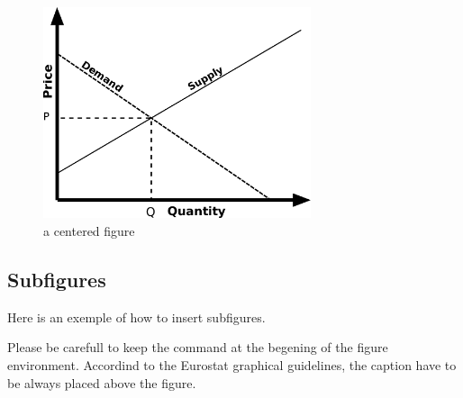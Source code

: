 \documentclass[Theme1]{{template_material/eurostat}}
\begin{document}
\begin{figure}[h]
    \caption{a centered figure} %
    \label{fig:figure2}
    \centering
    \includegraphics[width=0.7\textwidth]{template_material/FiguresFiles/Simple_supply_and_demand.svg.png}
\end{figure}

\newpage
\subsection{Subfigures}

Here is an exemple of how to insert subfigures. 

Please be carefull to keep the  command at the begening of the figure environment. Accordind to the Eurostat graphical guidelines, the caption have to be always placed above the figure.
\end{document}
